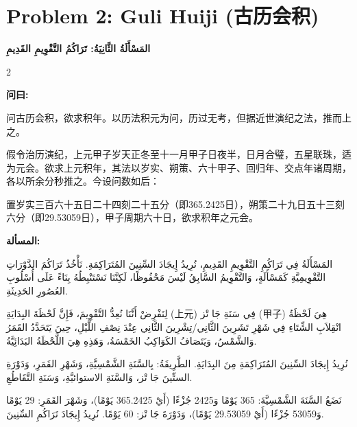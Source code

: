 \documentclass[11pt,a4paper]{article}
\newcommand{\ar}[1]{\arabicfont\beginR #1\endR}
\newcommand{\zhtext}[1]{{\chinese #1}}
\newenvironment{bilingual}{%
  \begin{paracol}{2}
}{%
  \end{paracol}
}
\newcommand{\cnlabel}[1]{\textcolor{algocolor}{\textbf{#1}}}
\newcommand{\arlabel}[1]{\ar{\textcolor{algocolor}{\textbf{#1}}}}
\begin{document}
\newpage

\section{Problem 2: Guli Huiji (\zhtext{古历会积})}
\ar{\textbf{المَسْأَلَةُ الثَّانِيَةُ: تَرَاكُمُ التَّقْوِيمِ القَدِيمِ}}

\begin{bilingual}

\begin{leftcolumn*}
\cnlabel{问曰:}

问古历会积，欲求积年。以历法积元为问，历过无考，但据近世演纪之法，推而上之。

假令治历演纪，上元甲子岁天正冬至十一月甲子日夜半，日月合璧，五星联珠，适为元会。欲求上元积年，其法以岁实、朔策、六十甲子、回归年、交点年诸周期，各以所余分秒推之。今设问数如后：

置岁实三百六十五日二十四刻二十五分（即365.2425日），朔策二十九日五十三刻六分（即29.53059日），甲子周期六十日，欲求积年之元会。
\end{leftcolumn*}

\begin{rightcolumn*}
\arlabel{المسألة:}

\ar{المَسْأَلَةُ فِي تَرَاكُمِ التَّقْوِيمِ القَدِيمِ، نُرِيدُ إِيجَادَ السِّنِينَ المُتَرَاكِمَةِ. نَأْخُذُ تَرَاكُمَ الدَّوْرَاتِ التَّقْوِيمِيَّةِ كَمَسْأَلَةٍ، وَالتَّقْوِيمُ السَّابِقُ لَيْسَ مَحْفُوظًا، لَكِنَّنَا نَسْتَنْبِطُهُ بِنَاءً عَلَى أُسْلُوبِ العُصُورِ الحَدِيثَةِ.}

\ar{لِنَفْرِضْ أَنَّنَا نُعِدُّ التَّقْوِيمَ، فَإِنَّ لَحْظَةَ البِدَايَةِ (上元) فِي سَنَةِ جَا تْز (甲子) هِيَ لَحْظَةُ انْقِلاَبِ الشِّتَاءِ فِي شَهْرِ تَشَرِينَ الثَّانِي/تِشْرِينَ الثَّانِي عِنْدَ نِصْفِ اللَّيْلِ، حِينَ يَتَحَدَّدُ القَمَرُ وَالشَّمْسُ، وَيَتَصَافُ الكَوَاكِبُ الخَمْسَةُ، وَهَذِهِ هِيَ اللَّحْظَةُ البَدَائِيَّةُ.}

\ar{نُرِيدُ إِيجَادَ السِّنِينَ المُتَرَاكِمَةِ مِنَ البِدَايَةِ. الطَّرِيقَةُ: بِالسَّنَةِ الشَّمْسِيَّةِ، وَشَهْرِ القَمَرِ، وَدَوْرَةِ الستِّينَ جَا تْز، وَالسَّنَةِ الاستوائيَّةِ، وَسَنَةِ التَّقَاطُعِ.}

\ar{نَضَعُ السَّنَةَ الشَّمْسِيَّةَ: 365 يَوْمًا وَ2425 جُزْءًا (أَيْ 365.2425 يَوْمًا)، وَشَهْرَ القَمَرِ: 29 يَوْمًا وَ53059 جُزْءًا (أَيْ 29.53059 يَوْمًا)، وَدَوْرَةَ جَا تْز: 60 يَوْمًا. نُرِيدُ إِيجَادَ تَرَاكُمِ السِّنِينَ.}
\end{rightcolumn*}

\end{bilingual}
\end{document}
